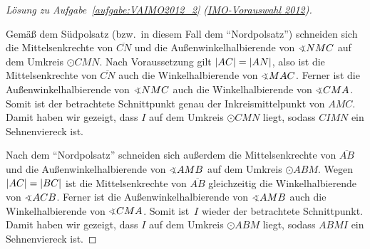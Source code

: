 \begin{proof}[Lösung zu Aufgabe~\ref{aufgabe:VAIMO2012_2} \textmd{(\href{https://www.mathe-wettbewerbe.de/fileadmin/Mathe-Wettbewerbe/AIMO/Aufgaben_und_Loesungen_AIMO/aufgaben_awb_12.pdf}{IMO-Vorauswahl 2012})}]
	\begin{figure}[ht]
		\centering
	\end{figure}
	
	Gemäß dem Südpolsatz (bzw.\ in diesem Fall dem \enquote{Nordpolsatz}) schneiden sich die Mittelsenkrechte von $\overline{CN}$ und die Außenwinkelhalbierende von $\winkel NMC$ auf dem Umkreis $\odot CMN$. 
	Nach Voraussetzung gilt $\abs*{AC}=\abs*{AN}$, also ist die Mittelsenkrechte von $\overline{CN}$ auch die Winkelhalbierende von $\winkel MAC$. Ferner ist die Außenwinkelhalbierende von $\winkel NMC$ auch die Winkelhalbierende von $\winkel CMA$. Somit ist der betrachtete Schnittpunkt genau der Inkreismittelpunkt von $AMC$. Damit haben wir gezeigt, dass $I$ auf dem Umkreis $\odot CMN$ liegt, sodass $CIMN$ ein Sehnenviereck ist.
	
	Nach dem \enquote{Nordpolsatz} schneiden sich außerdem die Mittelsenkrechte von $\overline{AB}$ und die Außenwinkelhalbierende von $\winkel AMB$ auf dem Umkreis $\odot ABM$. Wegen $\abs*{AC}=\abs*{BC}$ ist die Mittelsenkrechte von $\overline{AB}$ gleichzeitig die Winkelhalbierende von $\winkel ACB$. Ferner ist die Außenwinkelhalbierende von $\winkel AMB$ auch die Winkelhalbierende von $\winkel CMA$. Somit ist~$I$ wieder der betrachtete Schnittpunkt. Damit haben wir gezeigt, dass $I$ auf dem Umkreis $\odot ABM$ liegt, sodass $ABMI$ ein Sehnenviereck ist.
\end{proof}
